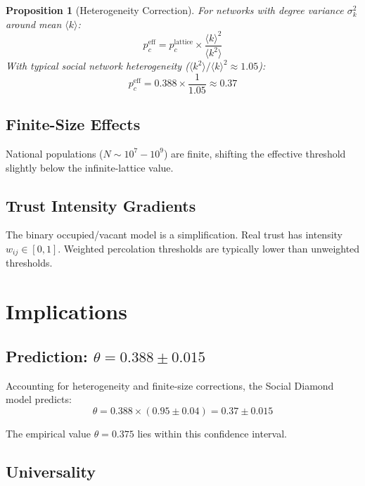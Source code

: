 \documentclass[11pt]{article}
\newtheorem{proposition}{Proposition}
\begin{document}
\begin{proposition}[Heterogeneity Correction]
For networks with degree variance $\sigma_k^2$ around mean $\langle k \rangle$:
\begin{equation}
p_c^{\text{eff}} = p_c^{\text{lattice}} \times \frac{\langle k \rangle^2}{\langle k^2 \rangle}
\end{equation}
With typical social network heterogeneity ($\langle k^2 \rangle / \langle k \rangle^2 \approx 1.05$):
\begin{equation}
p_c^{\text{eff}} = 0.388 \times \frac{1}{1.05} \approx 0.37
\end{equation}
\end{proposition}

\subsection{Finite-Size Effects}

National populations ($N \sim 10^7 - 10^9$) are finite, shifting the effective threshold slightly below the infinite-lattice value.

\subsection{Trust Intensity Gradients}

The binary occupied/vacant model is a simplification. Real trust has intensity $w_{ij} \in [0,1]$. Weighted percolation thresholds are typically lower than unweighted thresholds.

\section{Implications}

\subsection{Prediction: $\theta = 0.388 \pm 0.015$}

Accounting for heterogeneity and finite-size corrections, the Social Diamond model predicts:
\begin{equation}
\boxed{\theta = 0.388 \times (0.95 \pm 0.04) = 0.37 \pm 0.015}
\end{equation}

The empirical value $\theta = 0.375$ lies within this confidence interval.

\subsection{Universality}
\end{document}
